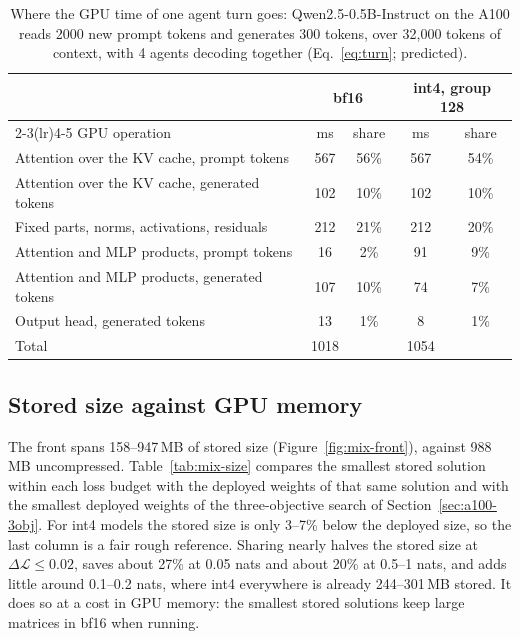 \documentclass[11pt]{article}
\newcommand{\dloss}{\Delta\mathcal{L}}
\begin{document}
\begin{table}[htbp]
\centering
\small
\begin{tabular}{lcccc}
\toprule
& \multicolumn{2}{c}{bf16} & \multicolumn{2}{c}{int4, group 128} \\
\cmidrule(lr){2-3}\cmidrule(lr){4-5}
GPU operation & ms & share & ms & share \\
\midrule
Attention over the KV cache, prompt tokens        & 567  & 56\% & 567  & 54\% \\
Attention over the KV cache, generated tokens     & 102  & 10\% & 102  & 10\% \\
Fixed parts, norms, activations, residuals        & 212  & 21\% & 212  & 20\% \\
Attention and MLP products, prompt tokens         & 16   & 2\%  & 91   & 9\%  \\
Attention and MLP products, generated tokens      & 107  & 10\% & 74   & 7\%  \\
Output head, generated tokens                     & 13   & 1\%  & 8    & 1\%  \\
\midrule
Total                                             & 1018 &      & 1054 &      \\
\bottomrule
\end{tabular}
\caption{Where the GPU time of one agent turn goes: Qwen2.5-0.5B-Instruct on the A100 reads 2000 new prompt
tokens and generates 300 tokens, over 32{,}000 tokens of context, with 4 agents decoding together
(Eq.~\ref{eq:turn}; predicted).}
\label{tab:turn}
\end{table}

\subsection{Stored size against GPU memory}
\label{sec:mix-size}
The front spans 158--947\,MB of stored size (Figure~\ref{fig:mix-front}), against 988\,MB uncompressed.
Table~\ref{tab:mix-size} compares the smallest stored solution within each loss budget with the deployed
weights of that same solution and with the smallest deployed weights of the three-objective search of
Section~\ref{sec:a100-3obj}. For int4 models the stored size is only 3--7\% below the deployed size, so the
last column is a fair rough reference. Sharing nearly halves the stored size at $\dloss\le0.02$, saves about 27\% at
0.05 nats and about 20\% at 0.5--1 nats, and adds little around 0.1--0.2 nats, where int4 everywhere is already 244--301\,MB stored. It
does so at a cost in GPU memory: the smallest stored solutions keep large matrices in bf16 when running.
\end{document}
